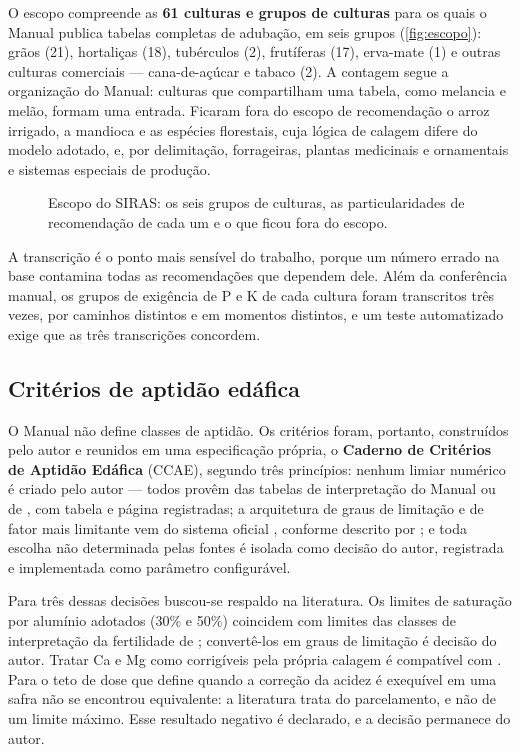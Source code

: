 O escopo compreende as \textbf{61 culturas e grupos de culturas} para os quais o Manual publica
tabelas completas de adubação, em seis grupos (\autoref{fig:escopo}): grãos (21), hortaliças
(18), tubérculos (2), frutíferas (17), erva-mate (1) e outras culturas comerciais --- cana-de-açúcar
e tabaco (2). A contagem segue a organização do Manual: culturas que compartilham uma tabela,
como melancia e melão, formam uma entrada. Ficaram fora do escopo de recomendação o arroz
irrigado, a mandioca e as espécies florestais, cuja lógica de calagem difere do modelo adotado,
e, por delimitação, forrageiras, plantas medicinais e ornamentais e sistemas especiais de
produção.

\begin{figure}[!tbp]
\centering
{}
\caption{Escopo do SIRAS: os seis grupos de culturas, as particularidades de recomendação de
cada um e o que ficou fora do escopo.}
\label{fig:escopo}
\end{figure}

A transcrição é o ponto mais sensível do trabalho, porque um número errado na base contamina
todas as recomendações que dependem dele. Além da conferência manual, os grupos de exigência
de P e K de cada cultura foram transcritos três vezes, por caminhos distintos e em momentos
distintos, e um teste automatizado exige que as três transcrições concordem.

\subsection{Critérios de aptidão edáfica}\label{sec:ccae}

O Manual não define classes de aptidão. Os critérios foram, portanto, construídos pelo autor e
reunidos em uma especificação própria, o \textbf{Caderno de Critérios de Aptidão Edáfica}
(CCAE), segundo três princípios: nenhum limiar numérico é criado pelo autor --- todos provêm das
tabelas de interpretação do Manual \citep{ManualCalagem2016} ou de \cite{EmbrapaDoc206}, com
tabela e página registradas; a arquitetura de graus de limitação e de fator mais limitante vem
do sistema oficial \citep{RamalhoFilhoBeek1995}, conforme descrito por \cite{Hofig2015}; e toda
escolha não determinada pelas fontes é isolada como decisão do autor, registrada e implementada
como parâmetro configurável.

Para três dessas decisões buscou-se respaldo na literatura. Os limites de saturação por alumínio
adotados (30\% e 50\%) coincidem com limites das classes de interpretação da fertilidade de
\cite{Alvarez1999}; convertê-los em graus de limitação é decisão do autor. Tratar Ca e Mg como corrigíveis pela própria
calagem é compatível com \cite{Sousa1989}. Para o teto de dose que define quando a correção da
acidez é exequível em uma safra não se encontrou equivalente: a literatura trata do
parcelamento, e não de um limite máximo. Esse resultado negativo é declarado, e a decisão
permanece do autor.

